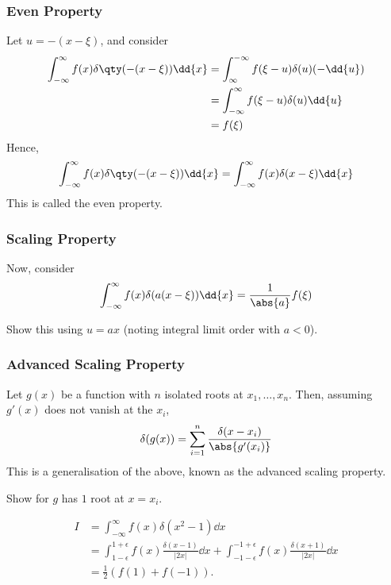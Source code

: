 \subsubsection{Even Property}
Let $u = -(x-\xi)$, and consider
\begin{align*}
	\int_{-\infty}^\infty f(x) \delta\qty(-(x-\xi)) \dd{x} &= \int_{\infty}^{-\infty} f(\xi - u) \delta(u) (-\dd{u}) \\
    &= \int_{-\infty}^\infty f(\xi - u) \delta(u) \dd{u} \\
    &= f(\xi)
\end{align*}
Hence,
\begin{align} \label{eq:6.10}
	\int_{-\infty}^\infty f(x) \delta\qty(-(x-\xi)) \dd{x} = \int_{-\infty}^\infty f(x) \delta(x-\xi) \dd{x}
\end{align}
This is called the even property.

\subsubsection{Scaling Property}
Now, consider
\begin{align} \label{eq:6.11}
	\int_{-\infty}^\infty f(x) \delta(a(x-\xi)) \dd{x} = \frac{1}{\abs{a}}f(\xi)
\end{align}

\begin{exercise}
	Show this using $u = ax$ (noting integral limit order with $a < 0$).
\end{exercise} 

\subsubsection{Advanced Scaling Property}
Let $g(x)$ be a function with $n$ isolated roots at $x_1, \dots, x_n$.
Then, assuming $g'(x)$ does not vanish at the $x_i$,
\begin{align} \label{eq:6.12}
	\delta(g(x)) = \sum_{i=1}^n \frac{\delta(x - x_i)}{\abs{g'(x_i)}}
\end{align}
This is a generalisation of the above, known as the advanced scaling property.
\begin{exercise}
	Show for $g$ has $1$ root at $x = x_i$.
\end{exercise} 

\begin{example}
	\begin{align*}
		I &= \int_{-\infty}^{\infty} f(x) \delta(x^2 - 1) \dd{x} \\
		&= \int_{1 - \epsilon}^{1 + \epsilon} f(x) \frac{\delta(x - 1)}{|2x|} \dd{x} + \int_{-1 - \epsilon}^{-1 + \epsilon} f(x) \frac{\delta(x + 1)}{|2x|} \dd{x} \\
		&= \frac{1}{2} (f(1) + f(-1)).
	\end{align*} 
\end{example} 

